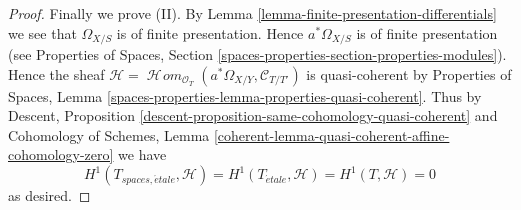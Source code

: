 \documentclass[10pt,a4paper]{amsart}
\theoremstyle{plain}
\theoremstyle{definition}
\theoremstyle{remark}
\numberwithin{equation}{subsection}
\def\SheafHom{\mathop{\mathcal{H}\!\mathit{om}}\nolimits}
\def\etale{{\acute{e}tale}}
\begin{document}
\begin{proof}
\medskip\noindent
Finally we prove (II). By
Lemma \ref{lemma-finite-presentation-differentials}
we see that $\Omega_{X/S}$ is of finite presentation.
Hence $a^*\Omega_{X/S}$ is of finite presentation (see
Properties of Spaces,
Section \ref{spaces-properties-section-properties-modules}).
Hence the sheaf
$\mathcal{H} =
\SheafHom_{\mathcal{O}_T}(a^*\Omega_{X/Y}, \mathcal{C}_{T/T'})$
is quasi-coherent by
Properties of Spaces,
Lemma \ref{spaces-properties-lemma-properties-quasi-coherent}.
Thus by
Descent, Proposition \ref{descent-proposition-same-cohomology-quasi-coherent}
and Cohomology of Schemes, Lemma
\ref{coherent-lemma-quasi-coherent-affine-cohomology-zero}
we have
$$
H^1(T_{spaces, \etale}, \mathcal{H}) =
H^1(T_\etale, \mathcal{H}) =
H^1(T, \mathcal{H}) = 0
$$
as desired.
\end{proof}
\end{document}
